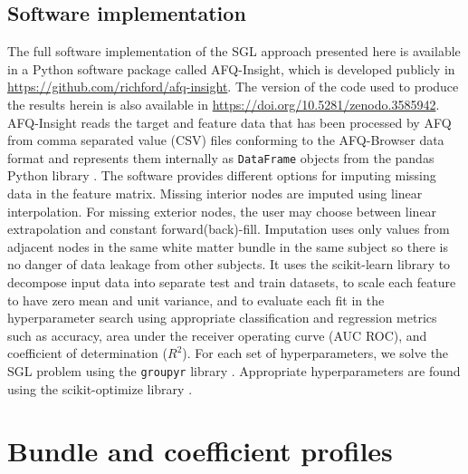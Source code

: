 \documentclass[10pt,%
               aps,%
               prl,%
               preprint,%
               superscriptaddress,%
               preprintnumbers,%
               amsmath,%
               floatfix,%
               endfloats*]{revtex4-2}
\begin{document}
\subsection{Software implementation}

The full software implementation of the SGL approach presented here is available
in a Python software package called AFQ-Insight, which is developed publicly in
\url{https://github.com/richford/afq-insight}. The version of the code used to
produce the results herein is also available in
\url{https://doi.org/10.5281/zenodo.3585942}.
AFQ-Insight reads the target and feature data that has been processed by AFQ
from comma separated value (CSV) files conforming to the AFQ-Browser data
format \cite{yeatman2018browser} and represents them internally as
\lstinline{DataFrame} objects from the pandas Python library
\cite{mckinney2010data}. The software provides different options for imputing
missing data in the feature matrix. Missing interior nodes are imputed using
linear interpolation. For missing exterior nodes, the user may choose between
linear extrapolation and constant forward(back)-fill. Imputation uses only
values from adjacent nodes in the same white matter bundle in the same
subject so there is no danger of data leakage from other subjects. It uses
the scikit-learn \cite{scikit-learn} library to decompose input data into
separate test and train datasets, to scale each feature to have zero mean and
unit variance, and to evaluate each fit in the hyperparameter search using
appropriate classification and regression metrics such as accuracy, area
under the receiver operating curve (AUC ROC), and coefficient of
determination ($R^2$). For each set of hyperparameters, we solve the SGL
problem using the \texttt{groupyr} library \cite{groupyr}. Appropriate
hyperparameters are found using the scikit-optimize library
\cite{scikit-optimize}.

\section{Bundle and coefficient profiles}
\label{sec:bundle-profiles}
\end{document}
